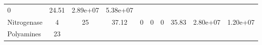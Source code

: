 \documentclass[]{article}
\begin{document}
\begin{longtable}[]{@{}lccccccccc@{}}
\begin{minipage}[t]{0.08\columnwidth}
0\strut
\end{minipage} & \begin{minipage}[t]{0.08\columnwidth}\centering\strut
24.51\strut
\end{minipage} & \begin{minipage}[t]{0.08\columnwidth}\centering\strut
2.89e+07\strut
\end{minipage} & \begin{minipage}[t]{0.08\columnwidth}\centering\strut
5.38e+07\strut
\end{minipage}\tabularnewline
\begin{minipage}[t]{0.07\columnwidth}\raggedright\strut
Nitrogenase\strut
\end{minipage} & \begin{minipage}[t]{0.06\columnwidth}\centering\strut
4\strut
\end{minipage} & \begin{minipage}[t]{0.08\columnwidth}\centering\strut
25\strut
\end{minipage} & \begin{minipage}[t]{0.08\columnwidth}\centering\strut
37.12\strut
\end{minipage} & \begin{minipage}[t]{0.08\columnwidth}\centering\strut
0\strut
\end{minipage} & \begin{minipage}[t]{0.08\columnwidth}\centering\strut
0\strut
\end{minipage} & \begin{minipage}[t]{0.08\columnwidth}\centering\strut
0\strut
\end{minipage} & \begin{minipage}[t]{0.08\columnwidth}\centering\strut
35.83\strut
\end{minipage} & \begin{minipage}[t]{0.08\columnwidth}\centering\strut
2.80e+07\strut
\end{minipage} & \begin{minipage}[t]{0.08\columnwidth}\centering\strut
1.20e+07\strut
\end{minipage}\tabularnewline
\begin{minipage}[t]{0.07\columnwidth}\raggedright\strut
Polyamines\strut
\end{minipage} & \begin{minipage}[t]{0.06\columnwidth}\centering\strut
23\strut
\end{minipage} & \begin{minipage}[t]{0.08\columnwidth}\centering\strut

\end{minipage}
\end{longtable}
\end{document}
